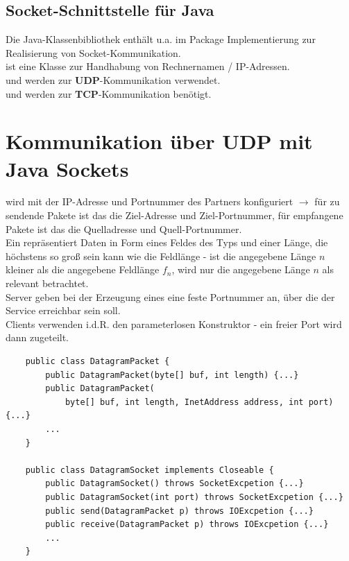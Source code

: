 \subsection{Socket-Schnittstelle für Java}

Die Java-Klassenbibliothek enthält u.a. im Package  Implementierung zur Realisierung von Socket-Kommunikation.\\

\noindent
{} ist eine Klasse zur Handhabung von Rechnernamen / IP-Adressen.\\

\noindent
{} und  werden zur \textbf{UDP}-Kommunikation verwendet.\\

\noindent
{} und  werden zur \textbf{TCP}-Kommunikation benötigt.


\section{Kommunikation über UDP mit Java Sockets}

 wird mit der IP-Adresse und Portnummer des Partners konfiguriert $\rightarrow$ für zu sendende Pakete ist das die Ziel-Adresse und Ziel-Portnummer, für empfangene Pakete ist das die Quelladresse und Quell-Portnummer.\\

\noindent
Ein  repräsentiert Daten in Form eines Feldes des Typs  und einer Länge, die höchstens so groß sein kann wie die Feldlänge - ist die angegebene Länge $n$ kleiner als die angegebene Feldlänge $f_n$, wird nur die angegebene Länge $n$ als relevant betrachtet.\\

\noindent
Server geben bei der Erzeugung eines  eine feste Portnummer an, über die der Service erreichbar sein soll.\\
Clients verwenden i.d.R. den parameterlosen Konstruktor - ein freier Port wird dann zugeteilt.

\begin{verbatim}
    public class DatagramPacket {
        public DatagramPacket(byte[] buf, int length) {...}
        public DatagramPacket(
            byte[] buf, int length, InetAddress address, int port) {...}
        ...
    }

    public class DatagramSocket implements Closeable {
        public DatagramSocket() throws SocketExcpetion {...}
        public DatagramSocket(int port) throws SocketExcpetion {...}
        public send(DatagramPacket p) throws IOExcpetion {...}
        public receive(DatagramPacket p) throws IOExcpetion {...}
        ...
    }
\end{verbatim}\\

